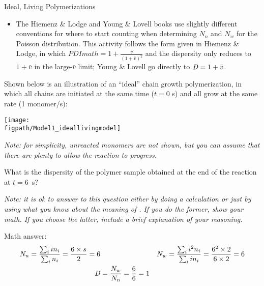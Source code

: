 \begin{activity}{Ideal, Living Polymerizations}
\begin{instructornotes}
\begin{itemize}
\begin{itemize}
				\item The Hiemenz \& Lodge and Young \& Lovell books use slightly different conventions for where to start counting when determining $N_n$ and $N_w$ for the Poisson distribution.  This activity follows the form given in Hiemenz \& Lodge, in which $PDImath = 1+\frac{\bar v}{(1+\bar v)^2}$ and the dispersity only reduces to $1 + \bar v$ in the large-$\bar v$ limit; Young \& Lovell go directly to $\PDImath = 1+\bar v$.
			\end{itemize}
	\end{itemize}
	
\end{instructornotes}


\begin{model}
	\label{\labelbase:mdl:idealliving}

	Shown below is an illustration of an ``ideal'' chain growth polymerization, in which all chains are initiated at the same time ($t=0$ s) and all grow at the same rate (1 monomer/s):
	    
	    \vspace{6pt}
	    	\centerline{\texttt{[image: \\figpath/Model1\_ideallivingmodel]}}
	    	
	    	\emph{Note: for simplicity, unreacted monomers are not shown, but you can assume that there are plenty to allow the reaction to progress.}
	
\end{model}


\begin{ctqs}

	\question What is the dispersity of the polymer sample obtained at the end of the reaction at $t=6$~s?
		
				\emph{Note: it is ok to answer to this question either by doing a calculation or just by using what you know about the meaning of \PDItext.  If you do the former, show your math. If you choose the latter, include a brief explanation of your reasoning.}
			
				\begin{solution}[1.5in]
				
					Math answer:
						\begin{align*}
							N_n = \frac{\sum_i i n_i}{\sum_i n_i} = \frac{6\times s}{2} = 6 &&&
							N_w = \frac{\sum_i i^2 n_i}{\sum_i i n_i} = \frac{6^2 \times 2}{6 \times 2} = 6\\
							\PDImath &= \frac{N_w}{N_n} = \frac{6}{6} = 1
						\end{align*}
					

\end{solution}
\end{ctqs}
\end{activity}
